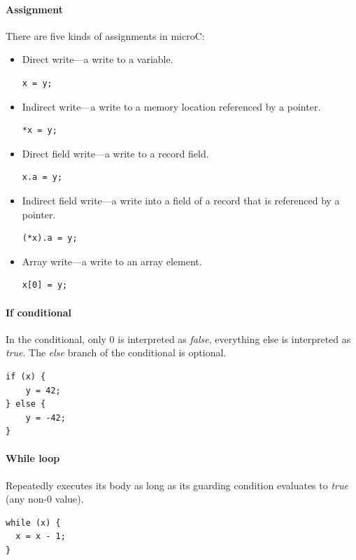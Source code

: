 \documentclass[thesis=M,english]{FITthesis}[2019/12/23]
\begin{document}
\paragraph*{Assignment} There are five kinds of assignments in microC:
\begin{itemize}
    \item Direct write---a write to a variable.
\begin{verbatim}
x = y;
\end{verbatim}
    \item Indirect write---a write to a memory location referenced by a pointer.
\begin{verbatim}
*x = y;
\end{verbatim}
    \item Direct field write---a write to a record field.
\begin{verbatim}
x.a = y;
\end{verbatim}
    \item Indirect field write---a write into a field of a record that is referenced by a pointer.
\begin{verbatim}
(*x).a = y;
\end{verbatim}
    \item Array write---a write to an array element.
\begin{verbatim}
x[0] = y;
\end{verbatim}
\end{itemize}

\paragraph*{If conditional} In the conditional, only 0 is interpreted as \emph{false}, everything else is interpreted as \emph{true}. The \emph{else} branch of the conditional is optional.
\begin{verbatim}
if (x) {
    y = 42;
} else {
    y = -42;
}
\end{verbatim}

\paragraph*{While loop} Repeatedly executes its body as long as its guarding condition evaluates to \emph{true} (any non-0 value).
\begin{verbatim}
while (x) {
  x = x - 1;
}
\end{verbatim}
\end{document}
